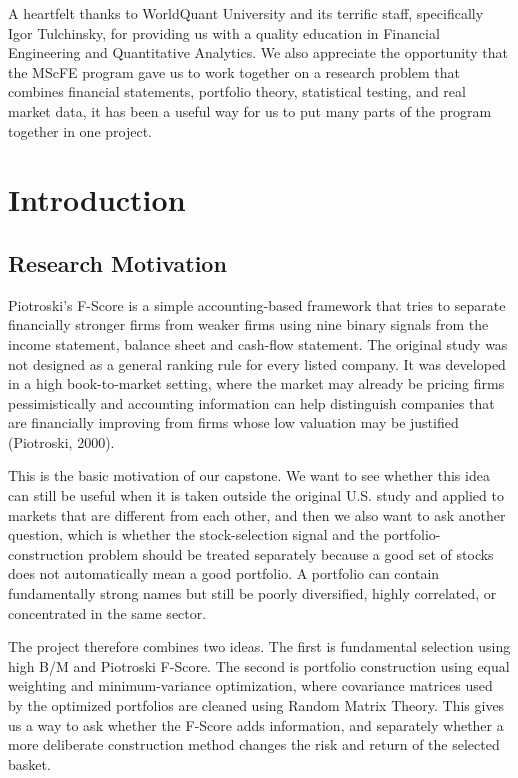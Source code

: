 \documentclass[11pt,a4paper]{report}
\numberwithin{figure}{chapter}
\numberwithin{table}{chapter}
\numberwithin{equation}{chapter}
\begin{document}
A heartfelt thanks to WorldQuant University and its terrific staff, specifically Igor Tulchinsky, for providing us with a quality education in Financial Engineering and Quantitative Analytics. We also appreciate the opportunity that the MScFE program gave us to work together on a research problem that combines financial statements, portfolio theory, statistical testing, and real market data, it has been a useful way for us to put many parts of the program together in one project.

\clearpage
\tableofcontents
\clearpage
\listoffigures
\clearpage
\listoftables
\clearpage
{}

\chapter{Introduction}
\label{chap:introduction}

\section{Research Motivation}

Piotroski's F-Score is a simple accounting-based framework that tries to separate financially stronger firms from weaker firms using nine binary signals from the income statement, balance sheet and cash-flow statement. The original study was not designed as a general ranking rule for every listed company. It was developed in a high book-to-market setting, where the market may already be pricing firms pessimistically and accounting information can help distinguish companies that are financially improving from firms whose low valuation may be justified (Piotroski, 2000).

This is the basic motivation of our capstone. We want to see whether this idea can still be useful when it is taken outside the original U.S. study and applied to markets that are different from each other, and then we also want to ask another question, which is whether the stock-selection signal and the portfolio-construction problem should be treated separately because a good set of stocks does not automatically mean a good portfolio. A portfolio can contain fundamentally strong names but still be poorly diversified, highly correlated, or concentrated in the same sector.

The project therefore combines two ideas. The first is fundamental selection using high B/M and Piotroski F-Score. The second is portfolio construction using equal weighting and minimum-variance optimization, where covariance matrices used by the optimized portfolios are cleaned using Random Matrix Theory. This gives us a way to ask whether the F-Score adds information, and separately whether a more deliberate construction method changes the risk and return of the selected basket.
\end{document}
